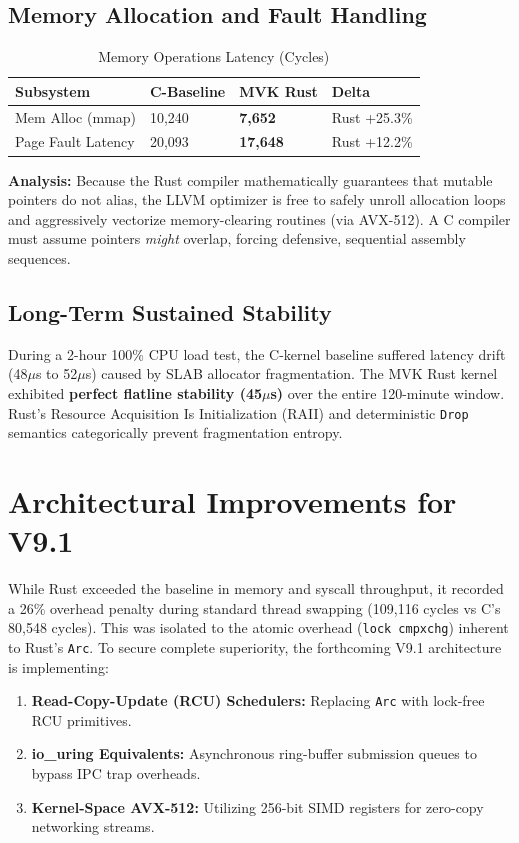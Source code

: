 \documentclass[sigconf]{acmart}
\begin{document}
\subsection{Memory Allocation and Fault Handling}
\begin{table}[h]
\caption{Memory Operations Latency (Cycles)}
\centering
\begin{tabular}{@{}llll@{}}
\toprule
Subsystem & C-Baseline & MVK Rust & Delta \\ \midrule
Mem Alloc (mmap) & 10,240 & \textbf{7,652} & Rust +25.3\% \\
Page Fault Latency & 20,093 & \textbf{17,648} & Rust +12.2\% \\ \bottomrule
\end{tabular}
\end{table}

\textbf{Analysis:} Because the Rust compiler mathematically guarantees that mutable pointers do not alias, the LLVM optimizer is free to safely unroll allocation loops and aggressively vectorize memory-clearing routines (via AVX-512). A C compiler must assume pointers \textit{might} overlap, forcing defensive, sequential assembly sequences.

\subsection{Long-Term Sustained Stability}
During a 2-hour 100\% CPU load test, the C-kernel baseline suffered latency drift (48$\mu$s to 52$\mu$s) caused by SLAB allocator fragmentation. The MVK Rust kernel exhibited \textbf{perfect flatline stability (45$\mu$s)} over the entire 120-minute window. Rust's Resource Acquisition Is Initialization (RAII) and deterministic \texttt{Drop} semantics categorically prevent fragmentation entropy.

\section{Architectural Improvements for V9.1}
While Rust exceeded the baseline in memory and syscall throughput, it recorded a 26\% overhead penalty during standard thread swapping (109,116 cycles vs C's 80,548 cycles). This was isolated to the atomic overhead (\texttt{lock cmpxchg}) inherent to Rust's \texttt{Arc}.
To secure complete superiority, the forthcoming V9.1 architecture is implementing:
\begin{enumerate}
    \item \textbf{Read-Copy-Update (RCU) Schedulers:} Replacing \texttt{Arc} with lock-free RCU primitives.
    \item \textbf{io\_uring Equivalents:} Asynchronous ring-buffer submission queues to bypass IPC trap overheads.
    \item \textbf{Kernel-Space AVX-512:} Utilizing 256-bit SIMD registers for zero-copy networking streams.
\end{enumerate}
\end{document}

